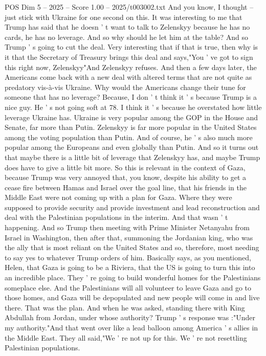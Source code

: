 \begin{textsample}{POS Dim 5 – 2025 – Score 1.00 – 2025/t003002.txt}
And you know, I thought -- just stick with Ukraine for one second on this.
It was interesting to me that Trump has said that he doesn ' t want to talk to Zelenskyy because he has no cards, he has no leverage.
And so why should he let him at the table?
And so Trump ' s going to cut the deal.
Very interesting that if that is true, then why is it that the Secretary of Treasury brings this deal and says,"You ' ve got to sign this right now, Zelenskyy"And Zelenskyy refuses.
And then a few days later, the Americans come back with a new deal with altered terms that are not quite as predatory vis-à-vis Ukraine.
Why would the Americans change their tune for someone that has no leverage?
Because, I don ' t think it ' s because Trump is a nice guy.
He ' s not going soft at 78.
I think it ' s because he overstated how little leverage Ukraine has.
Ukraine is very popular among the GOP in the House and Senate, far more than Putin.
Zelenskyy is far more popular in the United States among the voting population than Putin.
And of course, he ' s also much more popular among the Europeans and even globally than Putin.
And so it turns out that maybe there is a little bit of leverage that Zelenskyy has, and maybe Trump does have to give a little bit more.
So this is relevant in the context of Gaza, because Trump was very annoyed that, you know, despite his ability to get a cease fire between Hamas and Israel over the goal line, that his friends in the Middle East were not coming up with a plan for Gaza.
Where they were supposed to provide security and provide investment and lead reconstruction and deal with the Palestinian populations in the interim.
And that wasn ' t happening.
And so Trump then meeting with Prime Minister Netanyahu from Israel in Washington, then after that, summoning the Jordanian king, who was the ally that is most reliant on the United States and so, therefore, most needing to say yes to whatever Trump orders of him.
Basically says, as you mentioned, Helen, that Gaza is going to be a Riviera, that the US is going to turn this into an incredible place.
They ' re going to build wonderful homes for the Palestinians someplace else.
And the Palestinians will all volunteer to leave Gaza and go to those homes, and Gaza will be depopulated and new people will come in and live there.
That was the plan.
And when he was asked, standing there with King Abdullah from Jordan, under whose authority?
Trump ' s response was :"Under my authority."And that went over like a lead balloon among America ' s allies in the Middle East.
They all said,"We ' re not up for this.
We ' re not resettling Palestinian populations.

\end{textsample}
